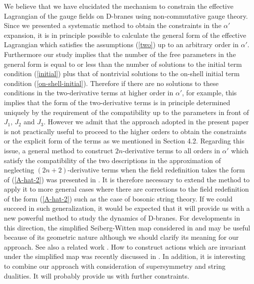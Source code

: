 \documentclass[a4paper,12pt]{article}
\begin{document}
We believe that we have elucidated the mechanism to constrain
the effective Lagrangian of the gauge fields on D-branes using
non-commutative gauge theory.
Since we presented a systematic method to obtain
the constraints in the $\alpha'$ expansion,
it is in principle possible to calculate
the general form of the effective Lagrangian which satisfies
the assumptions (\ref{two})
up to an arbitrary order in $\alpha'$.
Furthermore our study implies that
the number of the free parameters in the general form
is equal to or less than the number of solutions to
the initial term condition (\ref{initial})
plus that of nontrivial solutions
to the on-shell initial term condition (\ref{on-shell-initial}).
Therefore if there are no solutions to these conditions
in the two-derivative terms at higher order in $\alpha'$, for example,
this implies that
the form of the two-derivative terms is in principle
determined uniquely by the requirement of the compatibility
up to the parameters in front of $J_1$, $J_2$ and $J_3$.
However we admit that the approach adopted in the present paper
is not practically useful to proceed to the higher orders
to obtain the constraints
or the explicit form of the terms
as we mentioned in Section 4.2.
Regarding this issue,
a general method to construct
$2n$-derivative terms to all orders in $\alpha'$
which satisfy the compatibility of the two descriptions
in the approximation of neglecting $(2n+2)$-derivative terms
when the field redefinition takes the form of (\ref{A-hat-2})
was presented in \cite{Terashima}.
It is therefore necessary to extend the method
to apply it to more general cases
where there are corrections to
the field redefinition of the form (\ref{A-hat-2})
such as the case of bosonic string theory.
If we could succeed in such generalization,
it would be expected that it will provide us with
a new powerful method to study the dynamics of D-branes.
For developments in this direction,
the simplified Seiberg-Witten map considered in
\cite{Cornalba-Chiappa} and \cite{Ishibashi}
may be useful
because of its geometric nature
although we should clarify its meaning for our approach.
See also a related work \cite{Okuyama}.
How to construct actions which are invariant
under the simplified map was recently discussed in \cite{Cornalba}.
In addition, it is interesting to combine our approach
with consideration of supersymmetry and string dualities.
It will probably provide us with further constraints.
\end{document}
